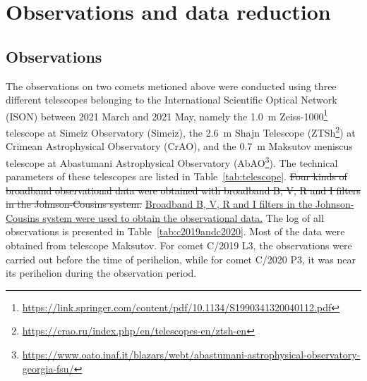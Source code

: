 \section{Observations and data reduction} \label{sec:obs_data}

\subsection{Observations}

The observations on two comets metioned above were conducted using three different telescopes belonging to the International Scientific Optical Network (ISON) between 2021 March and 2021 May, namely the {\qty{1.0}{\m}} Zeiss-1000\footnote{\url{https://link.springer.com/content/pdf/10.1134/S1990341320040112.pdf}} 
telescope at Simeiz Observatory (Simeiz), the {\qty{2.6}{\m}} Shajn Telescope (ZTSh\footnote{\url{https://crao.ru/index.php/en/telescopes-en/ztsh-en}}) 
at Crimean Astrophysical Observatory (CrAO), and the {\qty{0.7}{\m}} Maksutov meniscus telescope at Abastumani Astrophysical Observatory (AbAO\footnote{\url{https://www.oato.inaf.it/blazars/webt/abastumani-astrophysical-observatory-georgia-fsu/}}). 
The technical parameters of these telescopes are listed in Table~\ref{tab:telescope}. \st{Four kinds of broadband observational data were obtained with broadband B, V, R and I filters in the Johnson-Cousins system.} \ul{Broadband B, V, R and I filters in the Johnson-Cousins system were used to obtain the observational data.} The log of all observations is presented in Table~\ref{tab:c2019andc2020}. Most of the data were obtained from telescope Maksutov. For comet C/2019 L3, the observations were carried out before the time of perihelion, while for comet C/2020 P3, it was near its perihelion during the observation period. 


